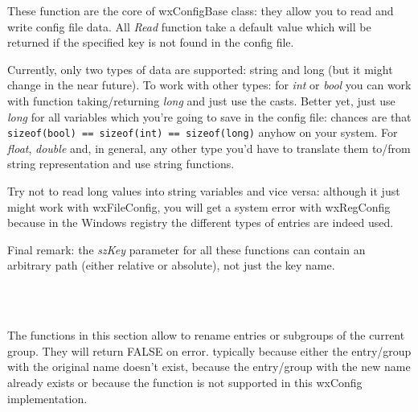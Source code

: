 
\\
\\
\\


\\
\\


These function are the core of wxConfigBase class: they allow you to read and
write config file data. All {\it Read} function take a default value which
will be returned if the specified key is not found in the config file.

Currently, only two types of data are supported: string and long (but it might
change in the near future). To work with other types: for {\it int} or {\it
bool} you can work with function taking/returning {\it long} and just use the
casts. Better yet, just use {\it long} for all variables which you're going to
save in the config file: chances are that {\tt sizeof(bool) == sizeof(int) == sizeof(long)} anyhow on your system. For {\it float}, {\it double} and, in
general, any other type you'd have to translate them to/from string
representation and use string functions.

Try not to read long values into string variables and vice versa: although it
just might work with wxFileConfig, you will get a system error with
wxRegConfig because in the Windows registry the different types of entries are
indeed used.

Final remark: the {\it szKey} parameter for all these functions can contain an
arbitrary path (either relative or absolute), not just the key name.

\\
\\


The functions in this section allow to rename entries or subgroups of the
current group. They will return FALSE on error. typically because either the
entry/group with the original name doesn't exist, because the entry/group with
the new name already exists or because the function is not supported in this
wxConfig implementation.

